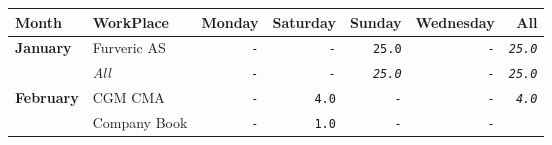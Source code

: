 \documentclass[11pt,A4paper,]{article}
\begin{document}
\begin{longtable}[]{@{}llrrrrr@{}}
\toprule
Month & WorkPlace & Monday & Saturday & Sunday & Wednesday &
All\tabularnewline
\midrule
\endhead
\textbf{January} & Furveric AS & \texttt{-} & \texttt{-} & \texttt{25.0}
& \texttt{-} & \emph{\texttt{25.0}}\tabularnewline
\begin{minipage}[t]{0.14\columnwidth}\raggedright\strut
\strut
\end{minipage} & \begin{minipage}[t]{0.14\columnwidth}\raggedright\strut
\emph{All}\strut
\end{minipage} & \begin{minipage}[t]{0.14\columnwidth}\raggedleft\strut
\emph{\texttt{-}}\strut
\end{minipage} & \begin{minipage}[t]{0.14\columnwidth}\raggedleft\strut
\emph{\texttt{-}}\strut
\end{minipage} & \begin{minipage}[t]{0.14\columnwidth}\raggedleft\strut
\emph{\texttt{25.0}}\strut
\end{minipage} & \begin{minipage}[t]{0.14\columnwidth}\raggedleft\strut
\emph{\texttt{-}}\strut
\end{minipage} & \begin{minipage}[t]{0.14\columnwidth}\raggedleft\strut
\emph{\texttt{25.0}}\strut
\end{minipage}\tabularnewline
\textbf{February} & CGM CMA & \texttt{-} & \texttt{4.0} & \texttt{-} &
\texttt{-} & \emph{\texttt{4.0}}\tabularnewline
\begin{minipage}[t]{0.14\columnwidth}\raggedright\strut
\strut
\end{minipage} & \begin{minipage}[t]{0.14\columnwidth}\raggedright\strut
Company Book\strut
\end{minipage} & \begin{minipage}[t]{0.14\columnwidth}\raggedleft\strut
\texttt{-}\strut
\end{minipage} & \begin{minipage}[t]{0.14\columnwidth}\raggedleft\strut
\texttt{1.0}\strut
\end{minipage} & \begin{minipage}[t]{0.14\columnwidth}\raggedleft\strut
\texttt{-}\strut
\end{minipage} & \begin{minipage}[t]{0.14\columnwidth}\raggedleft\strut
\texttt{-}\strut

\end{minipage}
\end{longtable}
\end{document}
